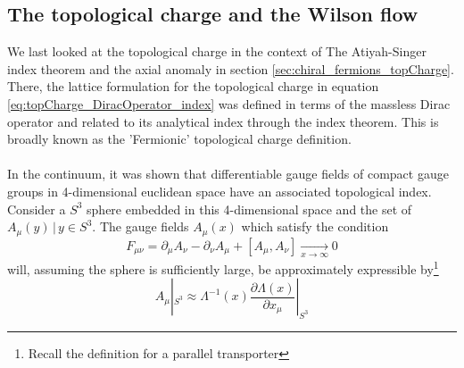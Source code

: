 \documentclass[a4paper,10pt]{article}
\begin{document}
\subsection{The topological charge and the Wilson flow}
We last looked at the topological charge in the context of The Atiyah-Singer index theorem and the axial anomaly in section \ref{sec:chiral_fermions_topCharge}. There, the lattice formulation for the topological charge in equation \eqref{eq:topCharge_DiracOperator_index} was defined in terms of the massless Dirac operator and related to its analytical index through the index theorem. This is broadly known as the 'Fermionic' topological charge definition.\\\\In the continuum, it was shown \cite{BelavinA.A1975Psot} that differentiable gauge fields of compact gauge groups in 4-dimensional euclidean space have an associated topological index. Consider a $S^3$ sphere embedded in this 4-dimensional space and the set of $A_\mu(y)\,|\,y\in S^3$. The gauge fields $A_\mu(x)$ which satisfy the condition 
\begin{equation}
F_{\mu \nu}=\partial_{\mu} A_{\nu}-\partial_{\nu} A_{\mu}+\left[A_{\mu}, A_{\nu}\right] \underset{x \rightarrow \infty}{\rightarrow} 0
\end{equation}
will, assuming the sphere is sufficiently large, be approximately expressible by\footnote{Recall the definition for a parallel transporter}
\begin{equation}
A_{\mu}\left|_{S^{3}} \approx \Lambda^{-1}(x) \frac{\partial \Lambda(x)}{\partial x_{\mu}}\right|_{S^{3}}
\end{equation}
\end{document}
